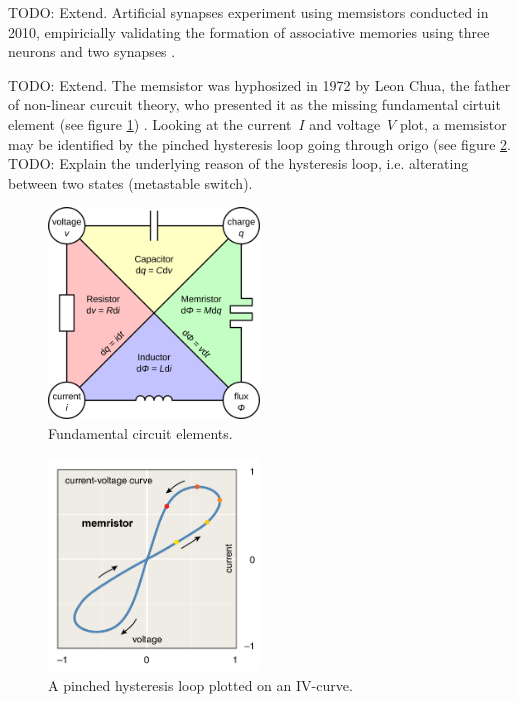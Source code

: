 \documentclass[12pt, a4paper]{article}
\begin{document}
TODO: Extend. Artificial synapses experiment using memsistors conducted in 2010, empiricially validating the formation of associative memories using three neurons and two synapses \cite{memristor_conditioning}.

TODO: Extend. The memsistor was hyphosized in 1972 by Leon Chua, the father of non-linear curcuit theory, who presented it as the missing fundamental cirtuit element (see figure \ref{fig:circuit_elements}) \cite{chua_memristor}. Looking at the current~$I$ and voltage~$V$ plot, a memsistor may be identified by the pinched hysteresis loop going through origo (see figure \ref{fig:pinched_hysteresis}. TODO: Explain the underlying reason of the hysteresis loop, i.e. alterating between two states (metastable switch).

\begin{figure}[htbp]
	\begin{center}
		\includegraphics[width=0.5\textwidth]{inc/circuit_elements.png}
		\caption{Fundamental circuit elements.\protect\footnotemark}
		\label{fig:circuit_elements}
	\end{center}
\end{figure}

\begin{figure}[htbp]
	\begin{center}
		\includegraphics[width=0.5\textwidth]{inc/pinched_hysteresis.png}
		\caption{A pinched hysteresis loop plotted on an IV-curve.\protect\footnotemark}
		\label{fig:pinched_hysteresis}
	\end{center}
\end{figure}
\end{document}
